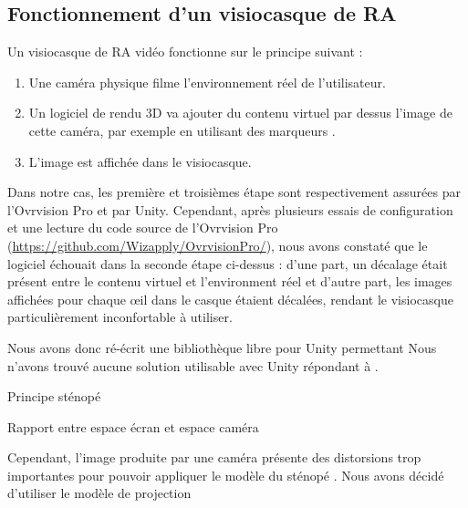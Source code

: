 \subsection{Fonctionnement d'un visiocasque de RA}
Un visiocasque de RA vidéo fonctionne sur le principe suivant :
\begin{enumerate}
  \item Une caméra physique filme l'environnement réel de l'utilisateur.
  \item Un logiciel de rendu 3D va ajouter du contenu virtuel par dessus l'image de cette caméra, par exemple en utilisant des marqueurs .
  \item L'image est affichée dans le visiocasque.
\end{enumerate}


Dans notre cas, les première et troisièmes étape sont respectivement assurées par l'Ovrvision Pro et par Unity. Cependant, après plusieurs essais de configuration et une lecture du code source de l'Ovrvision Pro (\url{https://github.com/Wizapply/OvrvisionPro/}), nous avons constaté que le logiciel échouait dans la seconde étape ci-dessus : d'une part, un décalage était présent entre le contenu virtuel et l'environment réel et d'autre part, les images affichées pour chaque \oe il dans le casque étaient décalées, rendant le visiocasque particulièrement inconfortable à utiliser.

Nous avons donc ré-écrit une bibliothèque libre pour Unity permettant 
Nous n'avons trouvé aucune solution utilisable avec Unity répondant à .

Principe sténopé

Rapport entre espace écran et espace caméra

Cependant, l'image produite par une caméra  présente des distorsions trop importantes pour pouvoir appliquer le modèle du sténopé . Nous avons décidé d'utiliser le modèle de projection 


